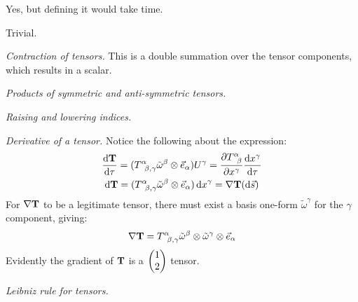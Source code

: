 \documentclass{report}
\begin{document}
\begin{subquests}
\begin{subquests}
		\item Yes, but defining it would take time.

		\item Trivial.
	\end{subquests}

	\item \emph{Contraction of tensors.} This is a double summation over the tensor components, which results in a scalar.

	\item \emph{Products of symmetric and anti-symmetric tensors.}
	\begin{subquests}
		\item

		\item

		\item
	\end{subquests}

	\item \emph{Raising and lowering indices.}
	\begin{subquests}
		\item 

		\item
	\end{subquests}

	\item \emph{Derivative of a tensor.}
	Notice the following about the expression:
	\begin{gather*}
		\dv{{\vb T}}{\tau} = (T^{\alpha}_{\;\;\beta,\gamma}{\tilde \omega}^\beta \otimes {\vec e}_{\alpha})U^{\gamma} = \pdv{T^{\alpha}_{\;\;\beta}}{x^{\gamma}}\dv{x^{\gamma}}{\tau} \\
		\dd{{\vb T}} =  (T^{\alpha}_{\;\;\beta,\gamma}{\tilde \omega}^\beta \otimes {\vec e}_{\alpha})\dd{x}^{\gamma} = \nabla{\vb T}\pqty{\dd{\vec s}}
	\end{gather*}
	For $\nabla{\vb T}$ to be a legitimate tensor, there must exist a basis one-form $\tilde \omega^{\gamma}$ for the $\gamma$ component, giving:
	\begin{gather*}
		\nabla{\vb T} = T^{\alpha}_{\;\;\beta,\gamma}{\tilde \omega}^{\beta} \otimes {\tilde \omega}^{\gamma} \otimes {\vec e}_{\alpha}
	\end{gather*}
	Evidently the gradient of $\vb T$ is a $\pmqty{1 \\ 2}$ tensor.

	\item \emph{Leibniz rule for tensors.}


\end{subquests}
\end{document}
